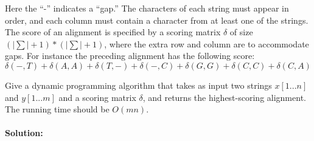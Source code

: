 \documentclass[12pt]{article}
\newcommand{\BigO}[1]{\ensuremath{O(#1)}}
\begin{document}
Here the ``-'' indicates a ``gap.'' The characters of each string must appear
in order, and each column must contain a character from at least one of 
the strings. The score of an alignment is specified by a scoring matrix
$\delta$
of size $(|\sum| + 1) * (|\sum| + 1)$, where the extra row and column are to
accommodate gaps. For instance the preceding alignment has the following score:
$$\delta(-, T ) + \delta(A, A) + \delta(T, -) + \delta(-, C) + \delta(G,
G) + \delta(C, C) + \delta(C, A)$$

Give a dynamic programming algorithm that takes as input two strings
$x[1 . . . n]$ and $y[1 . . . m]$ and a scoring matrix $\delta$, and returns
the highest-scoring alignment. The running time should be $\BigO{mn}$.

\paragraph{Solution:}
\end{document}
